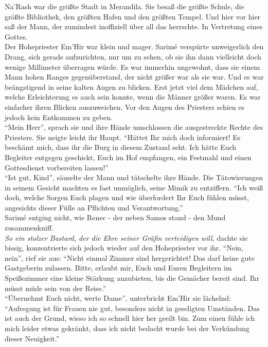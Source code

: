 Na'Rash war die größte Stadt in Merandila. Sie besaß die größte Schule, die größte Bibliothek, den 
größten Hafen und den größten Tempel. Und hier vor hier saß der Mann, der zumindest inoffiziell 
über all das herrschte. In Vertretung eines Gottes. \\
Der Hohepriester Em'Hir war klein und mager. Sarimé verspürte unweigerlich den Drang, sich gerade 
aufzurichten, nur um zu sehen, ob sie ihn dann vielleicht doch wenige Millimeter überragen würde. 
Es war immerhin ungewohnt, dass sie einem Mann hohen Ranges gegenüberstand, der nicht größer war 
als sie war. Und es war beängstigend in seine kalten Augen zu blicken. Erst jetzt viel dem 
Mädchen auf, welche Erleichterung es auch sein konnte, wenn die Männer größer waren. Es war 
einfacher ihren Blicken auszuweichen. Vor den Augen des Priesters schien es jedoch kein Entkommen zu 
geben.\\
``Mein Herr'', sprach sie und ihre Hände umschlossen die ausgestreckte Rechte des Priesters. Sie 
neigte leicht ihr Haupt. ``Hättet Ihr mich doch informiert! Es beschämt mich, dass ihr die Burg in 
diesem Zustand seht. Ich hätte Euch Begleiter entgegen geschickt, Euch im Hof empfangen, ein 
Festmahl und einen Gottesdienst vorbereiten lassen!''\\
``Ist gut, Kind'', säuselte der Mann und tätschelte ihre Hände. Die Tätowierungen in seinem Gesicht 
machten es fast unmöglich, seine Mimik zu entziffern. ``Ich weiß doch, welche Sorgen Euch plagen 
und wie überfordert Ihr Euch fühlen müsst, angesichts dieser Fülle an Pflichten und 
Verantwortung.''\\
Sarimé entging nicht, wie Renec - der neben Samos stand - den Mund zusammenkniff. \\
\textit{So ein stolzer Bastard, der die Ehre seiner Gräfin verteidigen will}, dachte sie bissig, 
konzentrierte sich jedoch wieder auf den Hohepriester vor ihr. ``Nein, nein'', rief sie aus: 
``Nicht einmal Zimmer sind hergerichtet! Das darf keine gute Gastgeberin zulassen. Bitte, erlaubt 
mir, Euch und Euren Begleitern im Speißezimmer eine kleine Stärkung anzubieten, bis die Gemächer 
bereit sind. Ihr müsst müde sein von der Reise.''\\
``Übernehmt Euch nicht, werte Dame'', unterbricht Em'Hir sie lächelnd: ``Aufregung ist für Frauen 
nie gut, besonders nicht in geseligten Umständen. Das ist auch der Grund, wieso ich so schnell 
hier her geeilt bin. Zum einen fühle ich mich leider etwas gekränkt, dass ich nicht bedacht wurde 
bei der Verkündung dieser Neuigkeit.''\\
